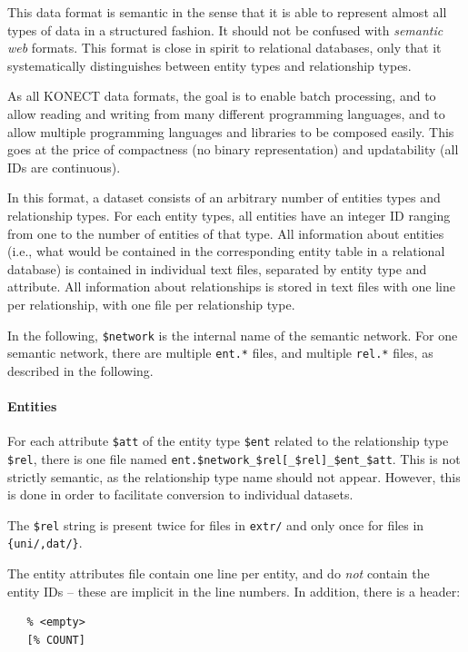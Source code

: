 \documentclass{article}
\begin{document}
This data format is semantic in the sense that it is able to represent
almost all types of data in a structured fashion.  It should not be
confused with \emph{semantic web} formats.  This format is close in
spirit to relational databases, only that it systematically
distinguishes between entity types and relationship types. 

As all KONECT data formats, the goal is to enable batch processing, and
to allow reading and writing from many different programming languages,
and to allow multiple programming languages and libraries to be composed
easily.  This goes at the price of compactness (no binary
representation) and updatability (all IDs are continuous). 

In this format, a dataset consists of an arbitrary number of entities
types and relationship types.  For each entity types, all entities have
an integer ID ranging from one
to the number of entities of that type.  All information about entities
(i.e., what would be contained in the corresponding entity table in a
relational database) is contained in individual text files, separated by
entity type and attribute.  All information about relationships is
stored in text files with one line per relationship, with one file per
relationship type.  

In the following, \texttt{\$network} is the internal name of the semantic
network. 
For one semantic network, there are multiple \texttt{ent.*} files, and
multiple \texttt{rel.*} files, as described in the following. 

\paragraph{Entities}

For each attribute \texttt{\$att} of the entity type \texttt{\$ent}
related to the relationship type \texttt{\$rel}, there is one file named 
\texttt{ent.\$network\_\$rel[\_\$rel]\_\$ent\_\$att}.  This is not strictly
semantic, as the relationship type name should not appear. However, this
is done in order to facilitate conversion to individual datasets.

The \texttt{\$rel} string is present twice for files in \texttt{extr/} and only once for files in \texttt{\{uni/,dat/\}}.

The entity attributes file contain one line per entity, and do
\emph{not} contain the entity IDs -- these are implicit in the line
numbers.  In addition, there is a header:

\begin{verbatim}
   % <empty>
   [% COUNT]
\end{verbatim}
\end{document}
